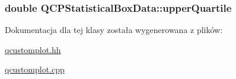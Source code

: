 \subsubsection[{\texorpdfstring{upper\+Quartile}{upperQuartile}}]{\setlength{\rightskip}{0pt plus 5cm}double Q\+C\+P\+Statistical\+Box\+Data\+::upper\+Quartile}\hypertarget{class_q_c_p_statistical_box_data_a5604dfe04b103e5ac73ce7895b46303b}{}\label{class_q_c_p_statistical_box_data_a5604dfe04b103e5ac73ce7895b46303b}


Dokumentacja dla tej klasy została wygenerowana z plików\+:\begin{DoxyCompactItemize}
\item 
\hyperlink{qcustomplot_8hh}{qcustomplot.\+hh}\item 
\hyperlink{qcustomplot_8cpp}{qcustomplot.\+cpp}\end{DoxyCompactItemize}
